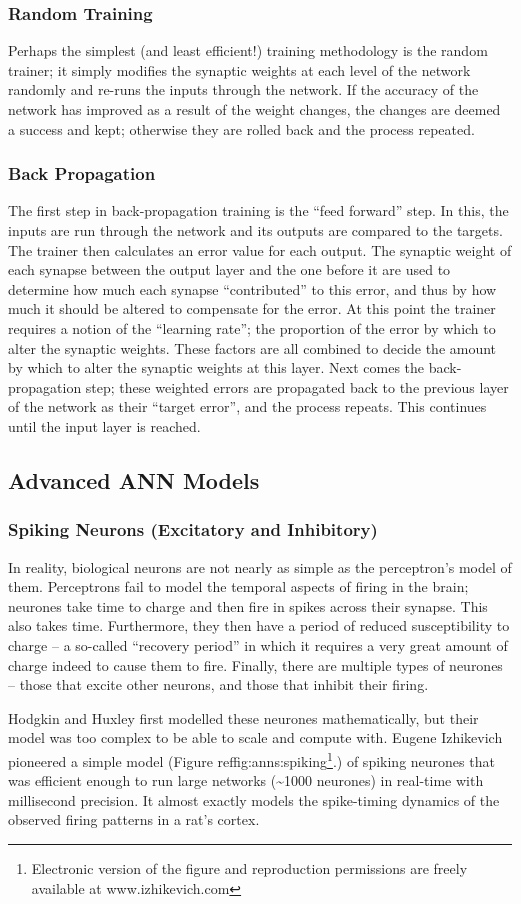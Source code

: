 \documentclass{acm_proc_article-sp}
\begin{document}
\subsubsection{Random Training}
{
Perhaps the simplest (and least efficient!) training methodology is the
random trainer; it simply modifies the synaptic weights at each level
of the network randomly and re{}-runs the inputs through the network.
If the accuracy of the network has improved as a result of the weight
changes, the changes are deemed a success and kept; otherwise they are
rolled back and the process repeated.
}
\subsubsection{Back Propagation}
{
The first step in back{}-propagation training is the ``feed forward''
step. In this, the inputs are run through the network and its outputs
are compared to the targets. The trainer then calculates an error value
for each output. The synaptic weight of each synapse between the output
layer and the one before it are used to determine how much each synapse
``contributed'' to this error, and thus by how much it should be
altered to compensate for the error. At this point the trainer requires
a notion of the ``learning rate''; the proportion of the error by which
to alter the synaptic weights. These factors are all combined to decide
the amount by which to alter the synaptic weights at this layer. Next
comes the back{}-propagation step; these weighted errors are propagated
back to the previous layer of the network as their ``target error'',
and the process repeats. This continues until the input layer is
reached.
}


\subsection{Advanced ANN Models}
\subsubsection{Spiking Neurons (Excitatory and Inhibitory)}
{
In reality, biological neurons are not nearly as simple as the
perceptron's model of them. Perceptrons fail to model
the temporal aspects of firing in the brain; neurones take time to
charge and then fire in spikes across their synapse. This also takes
time. Furthermore, they then have a period of reduced susceptibility to
charge {--} a so{}-called ``recovery period'' in which it requires a
very great amount of charge indeed to cause them to fire. Finally,
there are multiple types of neurones {--} those that excite other
neurons, and those that inhibit their firing.

Hodgkin and Huxley\cite{hodghux} first modelled these neurones mathematically, but their model was too complex to be able to scale and compute with. Eugene Izhikevich pioneered a simple model (Figure ref{fig:anns:spiking}\footnote{Electronic version of the figure and reproduction permissions are freely available at www.izhikevich.com}.) of spiking neurones\cite{izhikevich:simple} that was efficient enough to run large networks (\~{}1000 neurones) in real{}-time with millisecond precision. It almost exactly models the spike{}-timing dynamics of the observed firing patterns in a rat's cortex.
}
\end{document}
